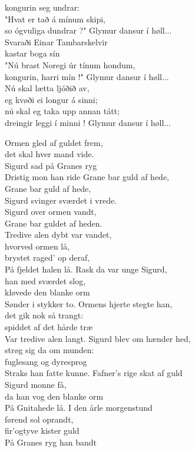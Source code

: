 kongurin seg undrar:\\
"Hvat er tað á mínum skipi,\\
so ógvuliga dundrar ?"
\hops
{} Glymur dansur í høll...
\hops
{}\\
Svaraði Einar Tambarskelvir\\
kastar boga sín\\
"Nú brast Noregi úr tínum hondum,\\
kongurin, harri mín !"
\hops
{} Glymur dansur í høll...
\hops
{}\\
Nú skal lætta ljóðið av,\\
eg kvøði ei longur á sinni;\\
nú skal eg taka upp annan tátt;\\
dreingir leggi í minni !
\hops
{} Glymur dansur í høll...

\clearpage
{}

Ormen gled af guldet frem,\\
det skal hver mand vide.\\
Sigurd sad på Granes ryg\\
Dristig mon han ride
\hops
{} Grane bar guld af hede,\\
 Grane bar guld af hede,\\
 Sigurd svinger sværdet i vrede.\\
 Sigurd over ormen vandt,\\
 Grane bar guldet af heden.\\
\hops
Tredive alen dybt var vandet,\\
hvorved ormen lå,\\
brystet raged' op deraf,\\
På fjeldet halen lå.
\hops
Rask da var unge Sigurd,\\
han med sværdet slog,\\
kløvede den blanke orm\\
Sønder i stykker to.
\hops
Ormens hjerte stegte han,\\
det gik nok så trangt:\\
spiddet af det hårde træ\\
Var tredive alen langt.
\hops
Sigurd blev om hænder hed,\\
strøg sig da om munden:\\
fuglesang og dyresprog\\
Straks han fatte kunne.
\hops
Fafner's rige skat af guld\\
Sigurd monne få,\\
da han vog den blanke orm\\
På Gnitahede lå.
\hops
I den årle morgenstund\\
førend sol oprandt,\\
fir'ogtyve kister guld\\
På Granes ryg han bandt 